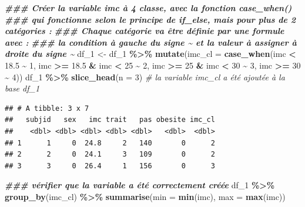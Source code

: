 \documentclass[
]{book}
\newenvironment{Shaded}{\begin{snugshade}}{\end{snugshade}}
\newcommand{\AttributeTok}[1]{\textcolor[rgb]{0.13,0.29,0.53}{#1}}
\newcommand{\CommentTok}[1]{\textcolor[rgb]{0.56,0.35,0.01}{\textit{#1}}}
\newcommand{\DecValTok}[1]{\textcolor[rgb]{0.00,0.00,0.81}{#1}}
\newcommand{\DocumentationTok}[1]{\textcolor[rgb]{0.56,0.35,0.01}{\textbf{\textit{#1}}}}
\newcommand{\FloatTok}[1]{\textcolor[rgb]{0.00,0.00,0.81}{#1}}
\newcommand{\FunctionTok}[1]{\textcolor[rgb]{0.13,0.29,0.53}{\textbf{#1}}}
\newcommand{\NormalTok}[1]{#1}
\newcommand{\OtherTok}[1]{\textcolor[rgb]{0.56,0.35,0.01}{#1}}
\newcommand{\SpecialCharTok}[1]{\textcolor[rgb]{0.81,0.36,0.00}{\textbf{#1}}}
\begin{document}
\begin{Shaded}
\begin{Highlighting}[]
\DocumentationTok{\#\#\# Créer la variable imc à 4 classe, avec la fonction case\_when()}
\DocumentationTok{\#\#\# qui fonctionne selon le principe de if\_else, mais pour plus de 2 catégories :}
\DocumentationTok{\#\#\# Chaque catégorie va être définie par une formule avec : }
\DocumentationTok{\#\#\# la condition à gauche du signe \textasciitilde{} et la valeur à assigner à droite du signe \textasciitilde{}}
\NormalTok{df\_1 }\OtherTok{\textless{}{-}}\NormalTok{ df\_1 }\SpecialCharTok{\%\textgreater{}\%} 
  \FunctionTok{mutate}\NormalTok{(}\AttributeTok{imc\_cl =} \FunctionTok{case\_when}\NormalTok{(imc }\SpecialCharTok{\textless{}} \FloatTok{18.5} \SpecialCharTok{\textasciitilde{}} \DecValTok{1}\NormalTok{,}
\NormalTok{                            imc }\SpecialCharTok{\textgreater{}=} \FloatTok{18.5} \SpecialCharTok{\&}\NormalTok{ imc }\SpecialCharTok{\textless{}} \DecValTok{25} \SpecialCharTok{\textasciitilde{}} \DecValTok{2}\NormalTok{,}
\NormalTok{                            imc }\SpecialCharTok{\textgreater{}=} \DecValTok{25} \SpecialCharTok{\&}\NormalTok{ imc }\SpecialCharTok{\textless{}} \DecValTok{30} \SpecialCharTok{\textasciitilde{}} \DecValTok{3}\NormalTok{,}
\NormalTok{                            imc }\SpecialCharTok{\textgreater{}=} \DecValTok{30} \SpecialCharTok{\textasciitilde{}} \DecValTok{4}\NormalTok{))}
\NormalTok{df\_1 }\SpecialCharTok{\%\textgreater{}\%} \FunctionTok{slice\_head}\NormalTok{(}\AttributeTok{n =} \DecValTok{3}\NormalTok{) }\CommentTok{\# la variable imc\_cl a été ajoutée à la base df\_1}
\end{Highlighting}
\end{Shaded}

\begin{verbatim}
## # A tibble: 3 x 7
##   subjid   sex   imc trait   pas obesite imc_cl
##    <dbl> <dbl> <dbl> <dbl> <dbl>   <dbl>  <dbl>
## 1      1     0  24.8     2   140       0      2
## 2      2     0  24.1     3   109       0      2
## 3      3     0  26.4     1   156       0      3
\end{verbatim}

\begin{Shaded}
\begin{Highlighting}[]
\DocumentationTok{\#\#\# vérifier que la variable a été correctement créée}
\NormalTok{df\_1 }\SpecialCharTok{\%\textgreater{}\%}
  \FunctionTok{group\_by}\NormalTok{(imc\_cl) }\SpecialCharTok{\%\textgreater{}\%}
  \FunctionTok{summarise}\NormalTok{(}\AttributeTok{min =} \FunctionTok{min}\NormalTok{(imc),}
            \AttributeTok{max =} \FunctionTok{max}\NormalTok{(imc))}
\end{Highlighting}
\end{Shaded}
\end{document}
